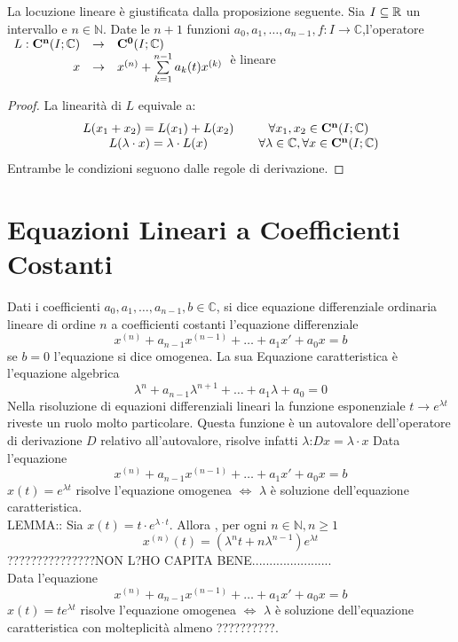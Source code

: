 \observation
La locuzione lineare è giustificata dalla proposizione seguente.
\proposition
Sia $I\subseteq \mathbb{R}$ un intervallo e $n\in\mathbb{N}$. Date le $n+1$ funzioni $a_0,a_1,\ldots,a_{n-1},f:I\to\mathbb{C}$,l'operatore 
$\begin{array}{rcl} 
L: \mathbf{C^{n}}(I;\mathbb{C}) & \to & \mathbf{C^{0}}(I;\mathbb{C}) \\
x & \to & x^{(n)}+\sum\limits_{k=1}^{n-1}a_k(t)x^{(k)} \\ 
\end{array}$è lineare
\begin{proof}
	La linearità di $L$ equivale a:
	$$ \begin{matrix}L(x_1+x_2)=L(x_1)+L(x_2) && \forall x_1,x_2\in \mathbf{C^{n}}(I;\mathbb{C})\\L(\lambda\cdot x)=\lambda\cdot L(x) && \forall\lambda\in\mathbb{C}, \forall x\in \mathbf{C^{n}}(I;\mathbb{C})\end{matrix} $$
	Entrambe le condizioni  seguono dalle regole di derivazione.
\end{proof}
\section{Equazioni Lineari a Coefficienti Costanti}
Dati i coefficienti $a_0,a_1,\ldots,a_{n-1},b\in\mathbb{C}$, si dice equazione differenziale ordinaria lineare di ordine $n$ a coefficienti costanti l'equazione differenziale
$$x^{(n)}+a_{n-1}x^{(n-1)}+\ldots+a_1 x'+a_0x=b$$
se $b=0$ l'equazione si dice omogenea. La sua Equazione caratteristica è l'equazione algebrica
$$\lambda^n+a_{n-1}\lambda^{n+1}+\ldots+a_1\lambda+a_0=0$$ 
\observation
Nella risoluzione di equazioni differenziali lineari la funzione esponenziale $t\to e^{\lambda t}$ riveste un ruolo molto particolare. Questa funzione è un autovalore dell'operatore di derivazione $D$ relativo all'autovalore, risolve infatti $\lambda$:$Dx=\lambda\cdot x$ 
\proposition
Data l'equazione
$$x^{(n)}+a_{n-1}x^{(n-1)}+\ldots+a_1 x'+a_0x=b$$
$x(t)=e^{\lambda t}$ risolve l'equazione omogenea $\Leftrightarrow$ $\lambda$ è soluzione dell'equazione caratteristica.\\

LEMMA:: Sia $x(t)=t\cdot e^{\lambda\cdot t}$. Allora , per ogni $n\in\mathbb{N}, n\ge 1$
$$x^{(n)}(t)=\left(\lambda^nt+n\lambda^{n-1}\right)e^{\lambda t}$$
???????????????NON L?HO CAPITA BENE.......................\\
\proposition
Data l'equazione 
$$x^{(n)}+a_{n-1}x^{(n-1)}+\ldots+a_1 x'+a_0x=b$$
$x(t)=te^{\lambda t}$ risolve l'equazione omogenea $\Leftrightarrow$ $\lambda$ è soluzione dell'equazione caratteristica con molteplicità almeno ??????????.






